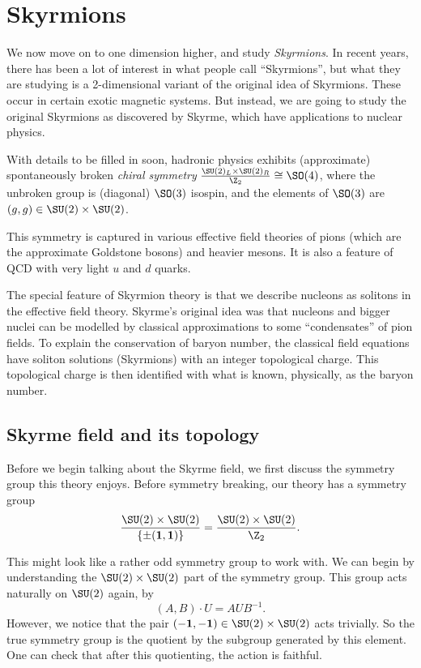 \documentclass[a4paper]{article}
\begin{document}
\section{Skyrmions}

We now move on to one dimension higher, and study \emph{Skyrmions}. In recent years, there has been a lot of interest in what people call ``Skyrmions'', but what they are studying is a 2-dimensional variant of the original idea of Skyrmions. These occur in certain exotic magnetic systems. But instead, we are going to study the original Skyrmions as discovered by Skyrme, which have applications to nuclear physics.

With details to be filled in soon, hadronic physics exhibits (approximate) spontaneously broken \emph{chiral symmetry} $\frac{\SU(2)_L \times \SU(2)_R}{\Z_2} \cong \SO(4)$, where the unbroken group is (diagonal) $\SO(3)$ isospin, and the elements of $\SO(3)$ are $(g, g) \in \SU(2) \times \SU(2)$.

This symmetry is captured in various effective field theories of pions (which are the approximate Goldstone bosons) and heavier mesons. It is also a feature of QCD with very light $u$ and $d$ quarks.

The special feature of Skyrmion theory is that we describe nucleons as solitons in the effective field theory. Skyrme's original idea was that nucleons and bigger nuclei can be modelled by classical approximations to some ``condensates'' of pion fields. To explain the conservation of baryon number, the classical field equations have soliton solutions (Skyrmions) with an integer topological charge. This topological charge is then identified with what is known, physically, as the baryon number.

\subsection{Skyrme field and its topology}
Before we begin talking about the Skyrme field, we first discuss the symmetry group this theory enjoys. Before symmetry breaking, our theory has a symmetry group
\[
  \frac{\SU(2) \times \SU(2)}{\{\pm (\mathbf{1}, \mathbf{1})\}} = \frac{\SU(2) \times \SU(2)}{\Z_2}.
\]

This might look like a rather odd symmetry group to work with. We can begin by understanding the $\SU(2) \times \SU(2)$ part of the symmetry group. This group acts naturally on $\SU(2)$ again, by
\[
  (A, B) \cdot U = AUB^{-1}.
\]
However, we notice that the pair $(-\mathbf{1}, -\mathbf{1}) \in \SU(2) \times \SU(2)$ acts trivially. So the true symmetry group is the quotient by the subgroup generated by this element. One can check that after this quotienting, the action is faithful.
\end{document}
